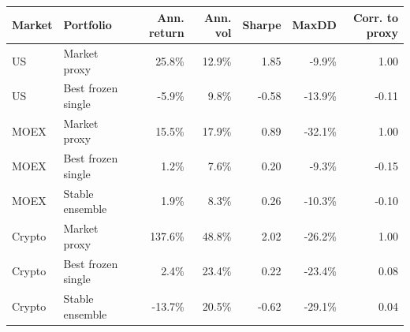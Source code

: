 \footnotesize
\setlength{\tabcolsep}{5pt}
\begin{tabular}{llrrrrr}
\toprule
Market & Portfolio & Ann. return & Ann. vol & Sharpe & MaxDD & Corr. to proxy \\
\midrule
US & Market proxy & 25.8\% & 12.9\% & 1.85 & -9.9\% & 1.00 \\
US & Best frozen single & -5.9\% & 9.8\% & -0.58 & -13.9\% & -0.11 \\
MOEX & Market proxy & 15.5\% & 17.9\% & 0.89 & -32.1\% & 1.00 \\
MOEX & Best frozen single & 1.2\% & 7.6\% & 0.20 & -9.3\% & -0.15 \\
MOEX & Stable ensemble & 1.9\% & 8.3\% & 0.26 & -10.3\% & -0.10 \\
Crypto & Market proxy & 137.6\% & 48.8\% & 2.02 & -26.2\% & 1.00 \\
Crypto & Best frozen single & 2.4\% & 23.4\% & 0.22 & -23.4\% & 0.08 \\
Crypto & Stable ensemble & -13.7\% & 20.5\% & -0.62 & -29.1\% & 0.04 \\
\bottomrule
\end{tabular}

